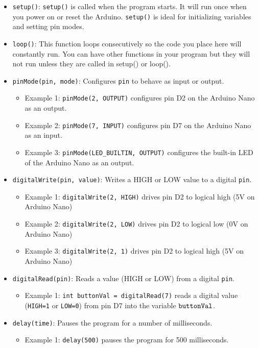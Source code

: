 \documentclass{article}
\begin{document}
\begin{itemize}
    \item \verb|setup()|: \verb|setup()| is called when the program starts. It will run once when you power on or reset the Arduino. \verb|setup()| is ideal for initializing variables and setting pin modes.
    \item \verb|loop()|: This function loops consecutively so the code you place here will constantly run. You can have other functions in your program but they will not run unless they are called in setup() or loop().
    \item \verb|pinMode(pin, mode)|: Configures \verb|pin| to behave as input or output.
    \begin{itemize}
        \item Example 1: \verb|pinMode(2, OUTPUT)| configures pin D2 on the Arduino Nano as an output.
        \item Example 2: \verb|pinMode(7, INPUT)| configures pin D7 on the Arduino Nano as an input.
        \item Example 3: \verb|pinMode(LED_BUILTIN, OUTPUT)| configures the built-in LED of the Arduino Nano as an output.
    \end{itemize}
    \item  \verb|digitalWrite(pin, value)|: Writes a HIGH or LOW value to a digital \verb|pin|.
    \begin{itemize}
        \item Example 1: \verb|digitalWrite(2, HIGH)| drives pin D2 to logical high (5V on Arduino Nano)
        \item Example 2: \verb|digitalWrite(2, LOW)| drives pin D2 to logical low (0V on Arduino Nano)
        \item Example 3: \verb|digitalWrite(2, 1)| drives pin D2 to logical high (5V on Arduino Nano)
    \end{itemize}
    \item \verb|digitalRead(pin)|: Reads a value (HIGH or LOW) from a digital \verb|pin|.
    \begin{itemize}
        \item Example 1: \verb|int buttonVal = digitalRead(7)| reads a digital value (\verb|HIGH=1| or \verb|LOW=0|) from pin D7 into the variable $\verb|buttonVal|$. 
    \end{itemize}
    \item \verb|delay(time)|: Pauses the program for a number of milliseconds.
    \begin{itemize}
        \item Example 1: \verb|delay(500)| pauses the program for 500 milliseconds.
    \end{itemize}
\end{itemize}
\end{document}
